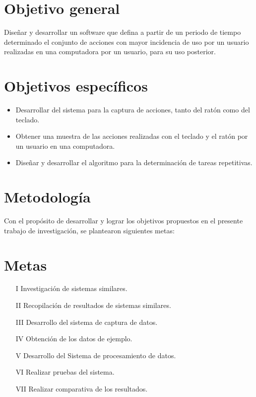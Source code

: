 \section{Objetivo general} 
Diseñar y desarrollar un software que defina a partir de un periodo de tiempo
 determinado el conjunto de acciones con mayor incidencia de uso por un usuario
 realizadas en una computadora por un usuario, para su uso posterior.

\section{Objetivos específicos}
\begin{itemize}
  \item Desarrollar del sistema para la captura de acciones, tanto del  ratón
  como del teclado.
  \item Obtener una muestra de las acciones realizadas con el teclado y el 
  ratón por un usuario en una computadora.
  \item Diseñar y desarrollar el algoritmo para la determinación de tareas
  repetitivas.
\end{itemize}


\section{Metodología}
Con el propósito de desarrollar y lograr los objetivos propuestos en el presente trabajo de investigación, se plantearon siguientes metas:
\section*{Metas}
\begin{itemize}
  \item[I] Investigación de sistemas similares.
  \item[II] Recopilación de resultados de sistemas similares.
  \item[III] Desarrollo del sistema  de captura de datos.
  \item[IV] Obtención de los datos de ejemplo.
  \item[V] Desarrollo del Sistema de procesamiento de datos.
  \item[VI] Realizar pruebas del sistema.
  \item[VII] Realizar comparativa de los resultados.
\end{itemize}